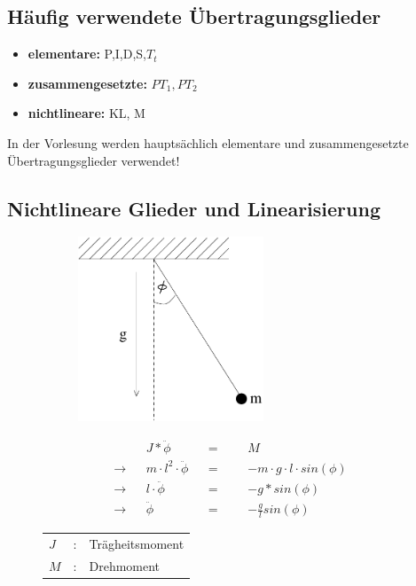 \documentclass[12pt,a4paper,ngerman]{scrartcl}
\begin{document}
\subsection{Häufig verwendete Übertragungsglieder}

\begin{itemize}
\item \textbf{elementare: }P,I,D,S,$T_t$
\item \textbf{zusammengesetzte: } $PT_1, PT_2$
\item \textbf{nichtlineare: } KL, M
\end{itemize}
In der Vorlesung werden hauptsächlich elementare und zusammengesetzte Übertragungsglieder verwendet!

\subsection{Nichtlineare Glieder und Linearisierung}

\begin{figure}[H]
  \begin{minipage}{.4\linewidth} %
\begin{figure}[H]
\includegraphics[height=5.5cm]{sysregel_bsp_6} %
\end{figure}
 \end{minipage}%
  \begin{minipage}{.6\linewidth} %
   \begin{align*}
    &&J*\ddot{\phi}&&=&&&M\\
\rightarrow&& m\cdot l^2 \cdot \ddot{\phi} &&=&&& -m\cdot g \cdot l \cdot sin(\phi)\\
\rightarrow&& l \cdot \ddot{\phi}&&=&&&-g*sin(\phi)\\
\rightarrow&& \ddot{\phi}&&=&&& -\frac{g}{l}sin(\phi)
   \end{align*}
   \begin{tabular}{lll}
$J$&:& Trägheitsmoment\\
$M$&:& Drehmoment
  
   \end{tabular}

\end{minipage}%
\end{figure}
\end{document}
